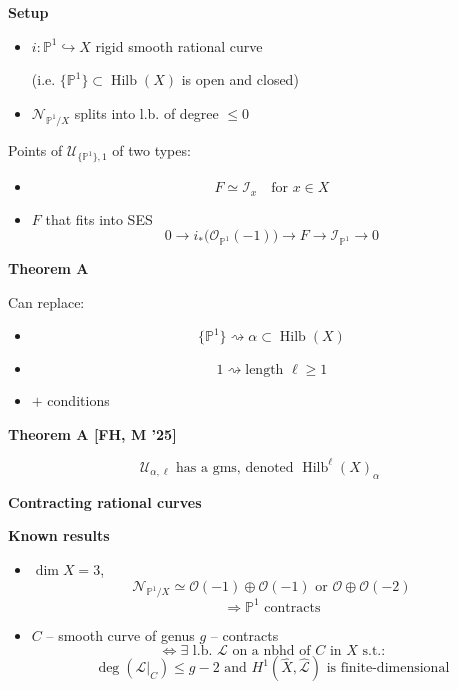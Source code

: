 \medskip\noindent
{\bf Setup}

\begin{itemize}
\item
$i\colon\mathbb P^1\hookrightarrow X$
rigid smooth rational curve

(i.e. $\{\mathbb P^1\}\subset
\operatorname{Hilb}(X)$ is open and
closed)

\item
$\mathcal N_{\mathbb P^1/X}$ splits into
l.b. of degree $\leq 0$
\end{itemize}

Points of
$\mathcal U_{\{\mathbb P^1\},1}$ of two
types:
\begin{itemize}
\item
$$
F\simeq\mathcal I_x
\quad\text{for }x\in X
$$

\item $F$ that fits into SES
$$
0\longrightarrow
i_*\bigl(\mathcal O_{\mathbb P^1}(-1)\bigr)
\longrightarrow F
\longrightarrow
\mathcal I_{\mathbb P^1}
\longrightarrow 0
$$
\end{itemize}

\medskip\noindent
{\bf Theorem A}

Can replace:
\begin{itemize}
\item
$$
\{\mathbb P^1\}
\rightsquigarrow
\alpha\subset\operatorname{Hilb}(X)
$$

\item
$$
1
\rightsquigarrow
\text{length }\ell\geq 1
$$

\item $+$ conditions
\end{itemize}

\medskip\noindent
{\bf Theorem A [FH, M '25]}

$$
\mathcal U_{\alpha,\ell}
\text{ has a gms, denoted }
\operatorname{Hilb}^{\ell}(X)_\alpha
$$

\medskip\noindent
{\bf Contracting rational curves}

\medskip\noindent
{\bf Known results}

\begin{itemize}
\item
[Reid '83] $\dim X=3$,
$$
\mathcal N_{\mathbb P^1/X}
\simeq
\mathcal O(-1)\oplus\mathcal O(-1)
\text{ or }
\mathcal O\oplus\mathcal O(-2)
$$
$$
\Longrightarrow
\mathbb P^1\text{ contracts}
$$

\item
[Jim\'enez '92] $C$ -- smooth curve of
genus $g$ -- contracts
$$
\Longleftrightarrow
\exists\text{ l.b. }\mathcal L
\text{ on a nbhd of }C\text{ in }X
\text{ s.t.:}
$$
$$
\deg(\mathcal L|_C)\leq g-2
\text{ and }
H^1(\widehat X,\widehat{\mathcal L})
\text{ is finite-dimensional}
$$
\end{itemize}

